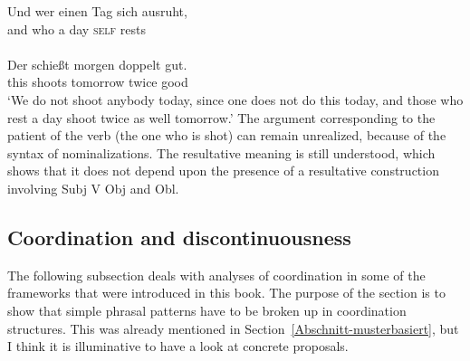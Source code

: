 \begin{exe}
\begin{xlist}[iv.]
\begin{exe}
\begin{xlist}[iv.]
\gll Und wer einen Tag sich ausruht,\\
     and who a day \textsc{self} rests\\\\
\gll Der schießt morgen doppelt gut.\footnotemark\\
this shoots tomorrow twice good\\
\glt `We do not shoot anybody today, since one does not do this today, and those who rest a day shoot
twice as well tomorrow.'
\zl
The argument corresponding to the patient of the verb (the one who is shot) can remain unrealized,
because of the syntax of nominalizations.  The resultative meaning is still understood, which shows
that it does not depend upon the presence of a resultative construction involving Subj V Obj and Obl.  


\subsection{Coordination and discontinuousness}
\label{Abschnitt-Koordination}
\label{Abschnitt-Koordination-diskont}\label{sec-coordination-cg}

The following subsection deals with analyses of coordination in some of the frameworks that were
introduced in this book. The purpose of the section is to show that simple phrasal patterns have to
be broken up in coordination structures. This was already mentioned in Section~\ref{Abschnitt-musterbasiert}, but I think it
is illuminative to have a look at concrete proposals.


\end{xlist}
\end{exe}
\end{xlist}
\end{exe}
